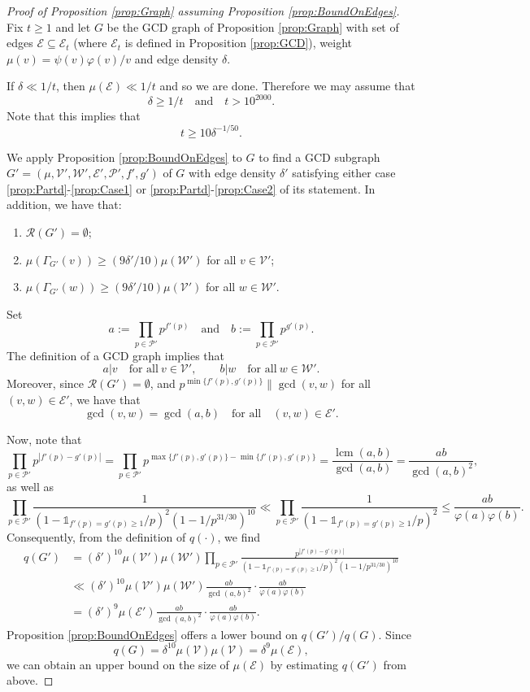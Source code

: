 \documentclass[12pt]{amsart}
\numberwithin{equation}{section}
\theoremstyle{definition}
\theoremstyle{remark}
\newcommand{\CE}{\mathcal{E}}
\newcommand{\CP}{\mathcal{P}}
\newcommand{\CR}{\mathcal{R}}
\newcommand{\CV}{\mathcal{V}}
\newcommand{\CW}{\mathcal{W}}
\newcommand{\un}{\mathds{1}}
\DeclareMathOperator{\lcm}{lcm}
\renewcommand{\phi}{\varphi}
\renewcommand{\le}{\leqslant}
\renewcommand{\ge}{\geqslant}
\begin{document}
\begin{proof}[Proof of Proposition \ref{prop:Graph} assuming Proposition \ref{prop:BoundOnEdges}] Fix $t\ge1$ and 
let $G$ be the GCD graph of Proposition \ref{prop:Graph} with set of edges $\CE\subseteq\CE_t$ (where $\CE_t$ is defined in Proposition \ref{prop:GCD}), weight $\mu(v)=\psi(v)\phi(v)/v$ and edge density $\delta$. 

If $\delta\ll 1/t$, then $\mu(\CE)\ll 1/t$ and so we are done. Therefore we may assume that 
\[
\delta\ge 1/t\quad\text{and}\quad t>10^{2000}.
\] 
Note that this implies that 
\[
t\ge 10\delta^{-1/50}.
\]

We apply Proposition \ref{prop:BoundOnEdges} to $G$ to find a GCD subgraph $G'=(\mu,\CV',\CW',\CE',\CP',f',g')$ of $G$ with edge density $\delta'$ satisfying either case \ref{prop:Partd}-\ref{prop:Case1} or \ref{prop:Partd}-\ref{prop:Case2} of its statement. In addition, we have that:
\begin{enumerate}
\item $\CR(G')=\emptyset$;
\item $\mu(\Gamma_{G'}(v))\ge(9\delta'/10)\mu(\CW')$ for all $v\in\CV'$;
\item $\mu(\Gamma_{G'}(w))\ge(9\delta'/10)\mu(\CV')$ for all $w\in\CW'$.
\end{enumerate}
Set
\[
a:=\prod_{p\in\CP'}p^{f'(p)}
\quad\text{and}\quad
b:=\prod_{p\in\CP'}p^{g'(p)}.
\]
The definition of a GCD graph implies that 
\[
a|v\quad\text{for all}\ v\in\CV',
\qquad b|w\quad \text{for all}\ w\in\CW'.
\] 
Moreover, since $\CR(G')=\emptyset$, and $p^{\min\{f'(p),g'(p)\}}\|\gcd(v,w)$ for all $(v,w)\in\CE'$, we have that 
\[
\gcd(v,w)=\gcd(a,b)
\quad\text{for all}\quad(v,w)\in\CE'.
\] 

Now, note that
\[
\prod_{p\in\CP'}p^{|f'(p)-g'(p)|} = \prod_{p\in\CP'}p^{\max\{f'(p),g'(p)\}-\min\{f'(p),g'(p)\}}= \frac{\lcm(a,b)}{\gcd(a,b)}
	= \frac{ab}{\gcd(a,b)^2} ,
\]
as well as 
\[
\prod_{p\in\CP'}\frac{1}{(1-\un_{f'(p)=g'(p)\ge1}/p)^2(1-1/p^{31/30})^{10}} 
	\ll \prod_{p\in\CP'}\frac{1}{(1-\un_{f'(p)=g'(p)\ge1}/p)^2} \le \frac{ab}{\phi(a)\phi(b)} .
\]
Consequently, from the definition of $q(\cdot)$, we find
\begin{align}
q(G') &=  (\delta')^{10}\mu(\CV')\mu(\CW')
	\prod_{p\in\CP'} \frac{p^{|f'(p)-g'(p)|}}{(1-\un_{f'(p)=g'(p)\ge1}/p)^2(1-1/p^{31/30})^{10}}\nonumber\\
	& \ll (\delta')^{10} \mu(\CV')\mu(\CW') \frac{ab}{\gcd(a,b)^2} \cdot  \frac{ab}{\phi(a)\phi(b)}\nonumber \\
	&= (\delta')^{9}\mu(\CE')  \frac{ab}{\gcd(a,b)^2} \cdot  \frac{ab}{\phi(a)\phi(b)} .\label{eq:QG'Bound}
\end{align}
Proposition \ref{prop:BoundOnEdges} offers a lower bound on $q(G')/q(G)$. Since
\[
q(G) = \delta^{10} \mu(\CV)\mu(\CV)= \delta^{9}\mu(\CE),
\]
we can obtain an upper bound on the size of $\mu(\CE)$ by estimating $q(G')$ from above.


\end{proof}
\end{document}
